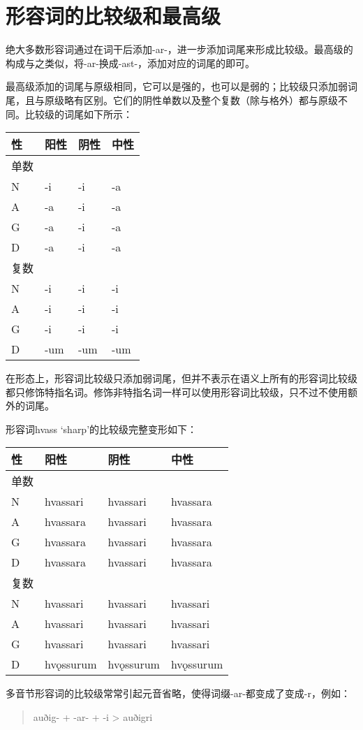 \section{形容词的比较级和最高级}\label{形容词的比较级和最高级}

绝大多数形容词通过在词干后添加-ar-，进一步添加词尾来形成比较级。最高级的构成与之类似，将-ar-换成-ast-，添加对应的词尾的即可。

最高级添加的词尾与原级相同，它可以是强的，也可以是弱的；比较级只添加弱词尾，且与原级略有区别。它们的阴性单数以及整个复数（除与格外）都与原级不同。比较级的词尾如下所示：

\begin{longtable}{llll}
    \toprule
    性   & 阳性 & 阴性 & 中性 \\
    \midrule
    \endhead
    \bottomrule
    \endfoot
    单数 &      &      &      \\
    N    & -i   & -i   & -a   \\
    A    & -a   & -i   & -a   \\
    G    & -a   & -i   & -a   \\
    D    & -a   & -i   & -a   \\
    复数 &      &      &      \\
    N    & -i   & -i   & -i   \\
    A    & -i   & -i   & -i   \\
    G    & -i   & -i   & -i   \\
    D    & -um  & -um  & -um  \\
\end{longtable}

在形态上，形容词比较级只添加弱词尾，但并不表示在语义上所有的形容词比较级都只修饰特指名词。修饰非特指名词一样可以使用形容词比较级，只不过不使用额外的词尾。

形容词hvass `sharp‌'的比较级完整变形如下：

\begin{longtable}{llll}
    \toprule
    性   & 阳性      & 阴性      & 中性      \\
    \midrule
    \endhead
    \bottomrule
    \endfoot
    单数 &           &           &           \\
    N    & hvassari  & hvassari  & hvassara  \\
    A    & hvassara  & hvassari  & hvassara  \\
    G    & hvassara  & hvassari  & hvassara  \\
    D    & hvassara  & hvassari  & hvassara  \\
    复数 &           &           &           \\
    N    & hvassari  & hvassari  & hvassari  \\
    A    & hvassari  & hvassari  & hvassari  \\
    G    & hvassari  & hvassari  & hvassari  \\
    D    & hvǫssurum & hvǫssurum & hvǫssurum \\
\end{longtable}
多音节形容词的比较级常常引起元音省略，使得词缀-ar-都变成了变成-r，例如：
\begin{quote}
    auðig- + -ar- + -i > auðigri
\end{quote}


